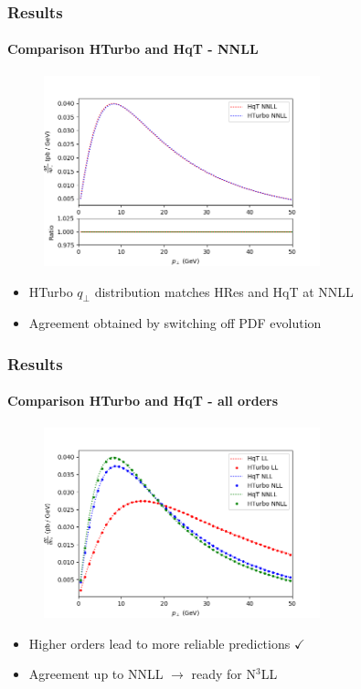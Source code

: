 \documentclass[aspectratio=43]{beamer}
\begin{document}
\begin{frame}

	\frametitle{Results}
	\framesubtitle{Comparison HTurbo and HqT - NNLL}
	
	\begin{figure}
		\includegraphics[width = 8cm]{plots/hturbo_NNLL_f2only2.png}
	\end{figure}
	
	\begin{itemize}
		\item HTurbo $q_{\perp}$ distribution matches HRes and HqT at NNLL
		\item Agreement obtained by switching off PDF evolution
\end{itemize}

\end{frame}

\begin{frame}
	
	\frametitle{Results}
	\framesubtitle{Comparison HTurbo and HqT - all orders}
	
	\begin{figure}
		\includegraphics[width = 8cm]{plots/hturbo_all_noevol.png}
	\end{figure}
	
	\begin{itemize}
		\item Higher orders lead to more reliable predictions {\color{darkgreen}$\checkmark$} 
		\item Agreement up to NNLL $\longrightarrow$ {\color{blue}ready for N$^{3}$LL}
	\end{itemize}

\end{frame}
\end{document}
